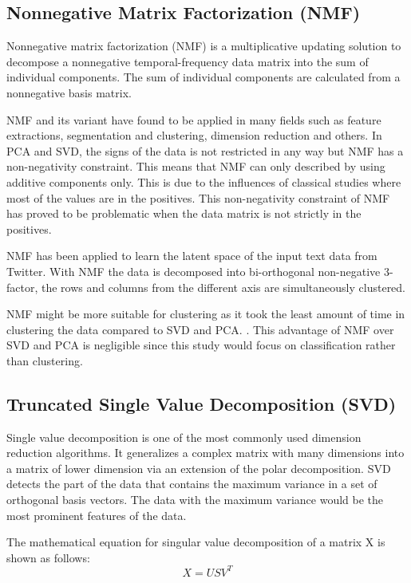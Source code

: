 \subsection{Nonnegative Matrix Factorization (NMF)}
Nonnegative matrix factorization (NMF) is a multiplicative updating solution to decompose a nonnegative temporal-frequency data matrix into the sum of individual components. The sum of individual components are calculated from a nonnegative basis matrix. \cite{nmfBook}

NMF and its variant have found to be applied in many fields such as feature extractions, segmentation and clustering, dimension reduction and others. In PCA and SVD, the signs of the data is not restricted in any way but NMF has a non-negativity constraint. This means that NMF can only described by using additive components only. This is due to the influences of classical studies where most of the values are in the positives. This non-negativity constraint of NMF has proved to be problematic when the data matrix is not strictly in the positives. \cite{semiNmfPca}

NMF has been applied to learn the latent space of the input text data from Twitter. With NMF the data is decomposed into bi-orthogonal non-negative 3-factor, the rows and columns from the different axis are simultaneously clustered. \cite{nmfTwitter}

NMF might be more suitable for clustering as it took the least amount of time in clustering the data compared to SVD and PCA. \cite{nmfClustering}. This advantage of NMF over SVD and PCA is negligible since this study would focus on classification rather than clustering.\\

\clearpage
\subsection{Truncated Single Value Decomposition (SVD)}
Single value decomposition is one of the most commonly used dimension reduction algorithms. It generalizes a complex matrix with many dimensions into a matrix of lower dimension via an extension of the polar decomposition. SVD detects the part of the data that contains the maximum variance in a set of orthogonal basis vectors. The data with the maximum variance would be the most prominent features of the data. \cite{svdDef}

The mathematical equation for singular value decomposition of a matrix X is shown as follows:
\begin{equation}
X = USV^{T}
\end{equation}

